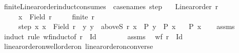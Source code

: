 \begin{isabellebody}
\isamarkupfalse%
%
\endisatagproof
{\isafoldproof}%
%
\isadelimproof
\isanewline
%
\endisadelimproof
\isanewline
{}\isamarkupfalse%
\ finite{\isacharunderscore}{\kern0pt}Linear{\isacharunderscore}{\kern0pt}order{\isacharunderscore}{\kern0pt}induct{\isacharbrackleft}{\kern0pt}consumes\ {}{\isacharcomma}{\kern0pt}\ case{\isacharunderscore}{\kern0pt}names\ step{\isacharbrackright}{\kern0pt}{\isacharcolon}{\kern0pt}\isanewline
\ \ \ {\isachardoublequoteopen}Linear{\isacharunderscore}{\kern0pt}order\ r{\isachardoublequoteclose}\isanewline
\ \ \ \ \ {\isachardoublequoteopen}x\ {\isasymin}\ Field\ r{\isachardoublequoteclose}\isanewline
\ \ \ \ \ {\isachardoublequoteopen}finite\ r{\isachardoublequoteclose}\isanewline
\ \ \ \ \ step{\isacharcolon}{\kern0pt}\ {\isachardoublequoteopen}{\isasymAnd}x{\isachardot}{\kern0pt}\ x\ {\isasymin}\ Field\ r\ {\isasymLongrightarrow}\ {\isacharparenleft}{\kern0pt}{\isasymAnd}y{\isachardot}{\kern0pt}\ y\ {\isasymin}\ aboveS\ r\ x\ {\isasymLongrightarrow}\ P\ y{\isacharparenright}{\kern0pt}\ {\isasymLongrightarrow}\ P\ x{\isachardoublequoteclose}\isanewline
\ \ \ {\isachardoublequoteopen}P\ x{\isachardoublequoteclose}\isanewline
%
\isadelimproof
\ \ %
\endisadelimproof
%
\isatagproof
{}\isamarkupfalse%
\ assms{\isacharparenleft}{\kern0pt}{}{\isacharparenright}{\kern0pt}\isanewline
{}\isamarkupfalse%
\ {\isacharparenleft}{\kern0pt}induct\ rule{\isacharcolon}{\kern0pt}\ wf{\isacharunderscore}{\kern0pt}induct{\isacharbrackleft}{\kern0pt}of\ {\isachardoublequoteopen}r{\isasyminverse}\ {\isacharminus}{\kern0pt}\ Id{\isachardoublequoteclose}{\isacharbrackright}{\kern0pt}{\isacharparenright}{\kern0pt}\isanewline
\ \ \isamarkupfalse%
\ {}\isanewline
\ \ \isamarkupfalse%
\ assms{\isacharparenleft}{\kern0pt}{}{\isacharcomma}{\kern0pt}{}{\isacharparenright}{\kern0pt}\ \isamarkupfalse%
\ {\isachardoublequoteopen}wf\ {\isacharparenleft}{\kern0pt}r{\isasyminverse}\ {\isacharminus}{\kern0pt}\ Id{\isacharparenright}{\kern0pt}{\isachardoublequoteclose}\isanewline
\ \ \ \ \isamarkupfalse%
\ linear{\isacharunderscore}{\kern0pt}order{\isacharunderscore}{\kern0pt}on{\isacharunderscore}{\kern0pt}well{\isacharunderscore}{\kern0pt}order{\isacharunderscore}{\kern0pt}on\ linear{\isacharunderscore}{\kern0pt}order{\isacharunderscore}{\kern0pt}on{\isacharunderscore}{\kern0pt}converse\isanewline

\end{isabellebody}
